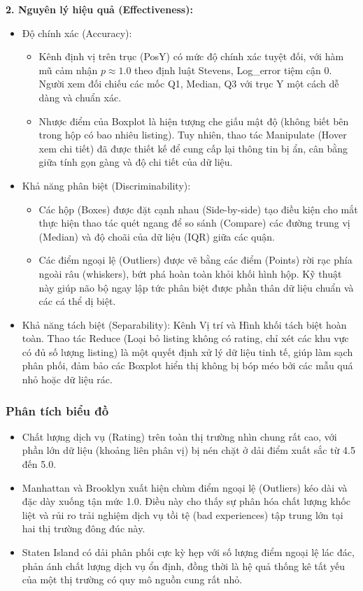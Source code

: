 \textbf{2. Nguyên lý hiệu quả (Effectiveness):}

\begin{itemize}
    \item Độ chính xác (Accuracy):
    \begin{itemize}
        \item Kênh định vị trên trục (PosY) có mức độ chính xác tuyệt đối, với hàm mũ cảm nhận $p \approx 1.0$ theo định luật Stevens, Log\_error tiệm cận $0$. Người xem đối chiếu các mốc Q1, Median, Q3 với trục Y một cách dễ dàng và chuẩn xác.
        \item Nhược điểm của Boxplot là hiện tượng che giấu mật độ (không biết bên trong hộp có bao nhiêu listing). Tuy nhiên, thao tác Manipulate (Hover xem chi tiết) đã được thiết kế để cung cấp lại thông tin bị ẩn, cân bằng giữa tính gọn gàng và độ chi tiết của dữ liệu.
    \end{itemize}
    \item Khả năng phân biệt (Discriminability):
    \begin{itemize}
        \item Các hộp (Boxes) được đặt cạnh nhau (Side-by-side) tạo điều kiện cho mắt thực hiện thao tác quét ngang để so sánh (Compare) các đường trung vị (Median) và độ choãi của dữ liệu (IQR) giữa các quận.
        \item Các điểm ngoại lệ (Outliers) được vẽ bằng các điểm (Points) rời rạc phía ngoài râu (whiskers), bứt phá hoàn toàn khỏi khối hình hộp. Kỹ thuật này giúp não bộ ngay lập tức phân biệt được phần thân dữ liệu chuẩn và các cá thể dị biệt.
    \end{itemize}
    \item Khả năng tách biệt (Separability): Kênh Vị trí và Hình khối tách biệt hoàn toàn. Thao tác Reduce (Loại bỏ listing không có rating, chỉ xét các khu vực có đủ số lượng listing) là một quyết định xử lý dữ liệu tinh tế, giúp làm sạch phân phối, đảm bảo các Boxplot hiển thị không bị bóp méo bởi các mẫu quá nhỏ hoặc dữ liệu rác.
\end{itemize}

\subsubsection{Phân tích biểu đồ}

\begin{itemize}
    \item Chất lượng dịch vụ (Rating) trên toàn thị trường nhìn chung rất cao, với phần lớn dữ liệu (khoảng liên phân vị) bị nén chặt ở dải điểm xuất sắc từ 4.5 đến 5.0.
    \item Manhattan và Brooklyn xuất hiện chùm điểm ngoại lệ (Outliers) kéo dài và đặc dày xuống tận mức 1.0. Điều này cho thấy sự phân hóa chất lượng khốc liệt và rủi ro trải nghiệm dịch vụ tồi tệ (bad experiences) tập trung lớn tại hai thị trường đông đúc này.
    \item Staten Island có dải phân phối cực kỳ hẹp với số lượng điểm ngoại lệ lác đác, phản ánh chất lượng dịch vụ ổn định, đồng thời là hệ quả thống kê tất yếu của một thị trường có quy mô nguồn cung rất nhỏ.
\end{itemize}
